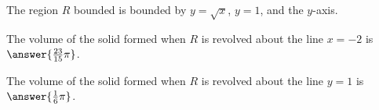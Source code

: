 \documentclass{ximera}
\author{Jim Talamo}
\begin{document}
\begin{exercise}

The region $R$ bounded is bounded by $y=\sqrt{x}$, $y=1$, and the $y$-axis.

The volume of the solid formed when $R$ is revolved about the line $x=-2$ is $\answer{\frac{23}{15} \pi}$.

The volume of the solid formed when $R$ is revolved about the line $y=1$ is $\answer{\frac{1}{6} \pi}$.

\end{exercise}
\end{document}

